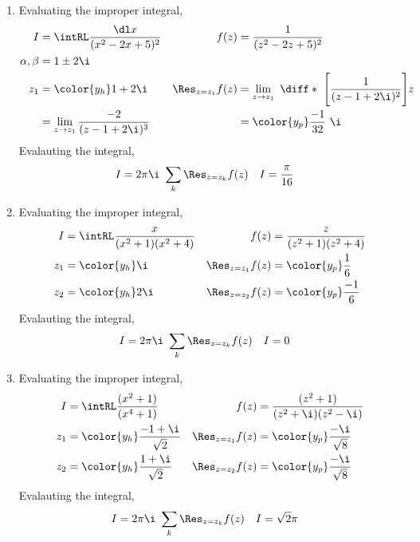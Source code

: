 \begin{enumerate}
    \item Evaluating the improper integral,
          \begin{align}
              I                   & = \intRL \frac{\dl x}{(x^2 - 2x + 5)^2}     &
              f(z)                & = \frac{1}{(z^2 - 2z + 5)^2}                  \\
              \alpha, \beta       & = 1 \pm 2\i                                   \\
              z_1                 & = \color{y_h} 1 + 2\i                       &
              \Res_{z = z_1} f(z) & = \lim_{z \to z_1}\ \diff*
              {\ \Bigg[\frac{1} {(z - 1 + 2\i)^2}\Bigg]}{z}                       \\
                                  & = \lim_{z \to z_1}\frac{-2}{(z -1 + 2\i)^3} &
                                  & = \color{y_p} \frac{-1}{32}\ \i
          \end{align}
          Evalauting the integral,
          \begin{align}
              I & = 2\pi\i\ \sum_{k} \Res_{z = z_k} f(z) &
              I & = \frac{\pi}{16}
          \end{align}

    \item Evaluating the improper integral,
          \begin{align}
              I                   & = \intRL \frac{x}{(x^2 + 1)(x^2 + 4)} &
              f(z)                & = \frac{z}{(z^2 + 1)(z^2 + 4)}          \\
              z_1                 & = \color{y_h} \i                      &
              \Res_{z = z_1} f(z) & = \color{y_p} \frac{1}{6}               \\
              z_2                 & = \color{y_h} 2\i                     &
              \Res_{z = z_2} f(z) & = \color{y_p} \frac{-1}{6}
          \end{align}
          Evalauting the integral,
          \begin{align}
              I & = 2\pi\i\ \sum_{k} \Res_{z = z_k} f(z) &
              I & = 0
          \end{align}

    \item Evaluating the improper integral,
          \begin{align}
              I                   & = \intRL \frac{(x^2 + 1)}{(x^4 + 1)}     &
              f(z)                & = \frac{(z^2 + 1)}{(z^2 + \i)(z^2 - \i)}   \\
              z_1                 & = \color{y_h} \frac{-1 + \i}{\sqrt{2}}   &
              \Res_{z = z_1} f(z) & = \color{y_p} \frac{-\i}{\sqrt{8}}         \\
              z_2                 & = \color{y_h} \frac{1 + \i}{\sqrt{2}}    &
              \Res_{z = z_2} f(z) & = \color{y_p} \frac{-\i}{\sqrt{8}}
          \end{align}
          Evalauting the integral,
          \begin{align}
              I & = 2\pi\i\ \sum_{k} \Res_{z = z_k} f(z) &
              I & = \sqrt{2}\pi
          \end{align}


\end{enumerate}
